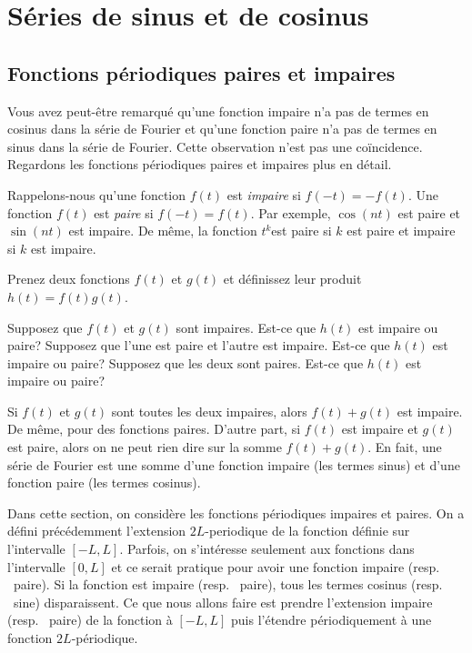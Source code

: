 
\sectionnewpage
\section{Séries de sinus et de cosinus}
\label{sec:scs}


\subsection{Fonctions périodiques paires et impaires}

Vous avez peut-être remarqué qu'une fonction impaire n'a pas de termes en cosinus dans la série de Fourier et qu'une fonction paire n'a pas de termes en sinus dans la série de Fourier.
Cette observation n'est pas une coïncidence. Regardons les fonctions périodiques paires et impaires plus en détail.

Rappelons-nous qu'une fonction $f(t)$ est \emph{impaire} si $f(-t) =
-f(t)$.  Une fonction $f(t)$ est \emph{paire} si
$f(-t) = f(t)$.  Par exemple, $\cos (n t)$ est paire et  $\sin (n t)$ est impaire.
De même, la fonction $t^k$est paire si $k$ est paire et impaire si $k$ est impaire.

\begin{exercise}
Prenez deux fonctions $f(t)$ et $g(t)$ et définissez leur produit $h(t) =
f(t)g(t)$.
\begin{tasks}
\task Supposez que $f(t)$ et $g(t)$ sont impaires.  Est-ce que $h(t)$ est impaire ou paire?
\task Supposez que l'une est paire et l'autre est impaire. Est-ce que $h(t)$ est impaire ou paire?
\task Supposez que les deux sont paires. Est-ce que $h(t)$ est impaire ou paire?
\end{tasks}
\end{exercise}

Si $f(t)$ et $g(t)$ sont toutes les deux impaires, alors $f(t)+g(t)$ est impaire.  De même, pour
des fonctions paires. D'autre part,
si  $f(t)$ est impaire et $g(t)$est paire,  alors on ne peut rien dire sur la somme
$f(t) + g(t)$.  En fait, une série de Fourier est une somme d'une fonction impaire (les termes sinus) et d'une fonction paire (les termes cosinus).

Dans cette section, on considère les fonctions périodiques impaires et paires. On a défini précédemment l'extension $2L$-periodique de la fonction définie sur l'intervalle $[-L,L]$.  Parfois, on s'intéresse seulement aux fonctions dans l'intervalle $[0,L]$ et ce serait pratique pour avoir une fonction impaire (resp. \ paire). Si la fonction est impaire (resp. \ paire), tous les termes cosinus (resp. \ sine) disparaissent.
Ce que nous allons faire est prendre l'extension impaire (resp. \ paire) de la fonction à $[-L,L]$ 
puis l'étendre périodiquement à une fonction $2L$-périodique.  

